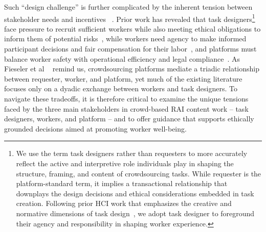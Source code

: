 Such ``design challenge'' is further complicated by the inherent tension between stakeholder needs and incentives ~\cite{finnerty2013keep, gaikwad2016boomerang, salehi2015we, irani2013turkopticon, salehi2018ink}. Prior work has revealed that task designers\footnote{We use the term task designers rather than requesters to more accurately reflect the active and interpretive role individuals play in shaping the structure, framing, and content of crowdsourcing tasks. While requester is the platform-standard term, it implies a transactional relationship that downplays the design decisions and ethical considerations embedded in task creation. Following prior HCI work that emphasizes the creative and normative dimensions of task design~\cite{bragg2018sprout, qian2025locating}, we adopt task designer to foreground their agency and responsibility in shaping worker experience.} face pressure to recruit sufficient workers while also meeting ethical obligations to inform them of potential risks~\cite{qian2025locating, finnerty2013keep, kittur2008crowdsourcing, zheng2011task, bragg2018sprout}, while workers need agency to make informed participant decisions and fair compensation for their labor~\cite{irani2013turkopticon, salehi2018ink, martin2014being, silberman2018responsible, toxtli2021quantifying, schlicher2021flexible}, and platforms must balance worker safety with operational efficiency and legal compliance~\cite{gaikwad2016boomerang, xu2017incentivizing, xia2020privacy, allen2018design}. 
As Fieseler et al ~\cite{fieseler_unfairness_2019} remind us, crowdsourcing platforms mediate a triadic relationship between requester, worker, and platform, yet much of the existing literature focuses only on a dyadic exchange between workers and task designers.
To navigate these tradeoffs, it is therefore critical to examine the unique tensions faced by the three main stakeholders in crowd-based RAI content work -- task designers, workers, and platform -- and to offer guidance that supports ethically grounded decisions aimed at promoting worker well-being. 

